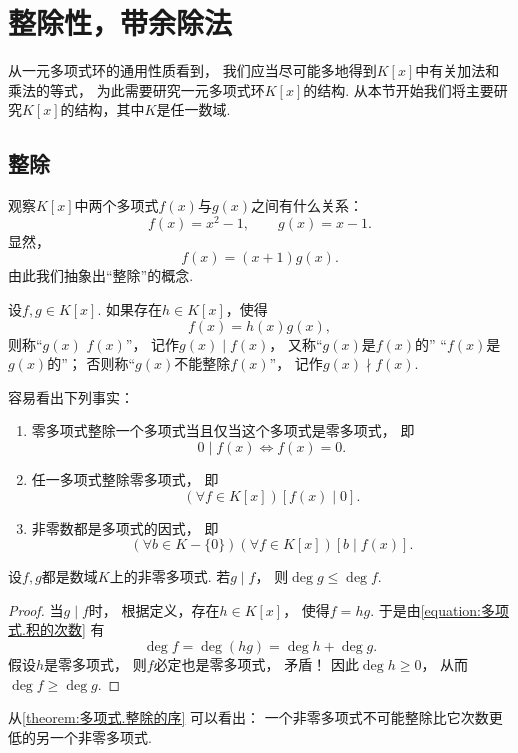 \section{整除性，带余除法}
从一元多项式环的通用性质看到，
我们应当尽可能多地得到\(K[x]\)中有关加法和乘法的等式，
为此需要研究一元多项式环\(K[x]\)的结构.
从本节开始我们将主要研究\(K[x]\)的结构，其中\(K\)是任一数域.

\subsection{整除}
观察\(K[x]\)中两个多项式\(f(x)\)与\(g(x)\)之间有什么关系：\[
	f(x)=x^2-1, \qquad
	g(x)=x-1.
\]
显然，\[
	f(x)=(x+1) g(x).
\]
由此我们抽象出“整除”的概念.

\begin{definition}
设\(f,g \in K[x]\).
如果存在\(h \in K[x]\)，使得\[
	f(x) = h(x) g(x),
\]
则称“\(g(x)\)  \(f(x)\)”，
记作\(g(x) \mid f(x)\)，
又称“\(g(x)\)是\(f(x)\)的”
“\(f(x)\)是\(g(x)\)的”；
否则称“\(g(x)\)不能整除\(f(x)\)”，
记作\(g(x) \nmid f(x)\).
\end{definition}

容易看出下列事实：
\begin{enumerate}
	\item 零多项式整除一个多项式当且仅当这个多项式是零多项式，
	即\[
		0 \mid f(x)
		\iff
		f(x) = 0.
	\]
	\item 任一多项式整除零多项式，
	即\[
		(\forall f \in K[x])
		[f(x) \mid 0].
	\]
	\item 非零数都是多项式的因式，
	即\[
		(\forall b \in K - \{0\})
		(\forall f \in K[x])
		[b \mid f(x)].
	\]
\end{enumerate}

\begin{proposition}\label{theorem:多项式.整除的序}
设\(f,g\)都是数域\(K\)上的非零多项式.
若\(g \mid f\)，
则\(\deg g \leq \deg f\).
\begin{proof}
当\(g \mid f\)时，
根据定义，存在\(h \in K[x]\)，
使得\(f = h g\).
于是由\cref{equation:多项式.积的次数} 有\[
	\deg f
	= \deg(hg)
	= \deg h + \deg g.
\]
假设\(h\)是零多项式，
则\(f\)必定也是零多项式，
矛盾！
因此\(\deg h\geq0\)，
从而\(\deg f\geq\deg g\).
\end{proof}
\end{proposition}

从\cref{theorem:多项式.整除的序} 可以看出：
一个非零多项式不可能整除比它次数更低的另一个非零多项式.

